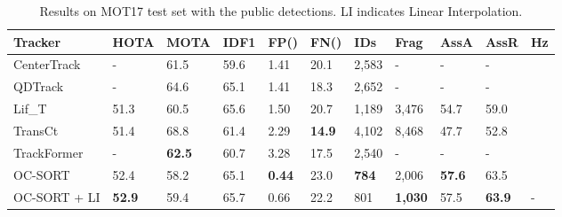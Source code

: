 \documentclass[10pt,twocolumn,letterpaper]{article}
\begin{document}
\begin{table*}[t]
\centering
\caption{Results on MOT17 test set with the public detections. LI indicates Linear Interpolation.
}
\setlength{\tabcolsep}{7pt}
\scriptsize
\begin{tabular}{ l | p{20px}p{20px}p{20px}p{27px} p{27px}p{22px}p{22px}p{20px}p{20px} H}

\toprule
Tracker & HOTA & MOTA & IDF1  &  FP({\footnotesize }) & FN({\footnotesize }) & IDs & Frag & AssA & AssR & Hz\\
\midrule
CenterTrack~\cite{centertrack} & - & 61.5 & 59.6 & 1.41 & 20.1 & 2,583 & - & - & - \\
QDTrack~\cite{pang2021quasi} & - & 64.6 & 65.1  & 1.41 & 18.3 & 2,652 & - & - & - \\
Lif\_T~\cite{hornakova2020lifted} & 51.3 & 60.5 & 65.6  & 1.50 & 20.7 & 1,189 & 3,476 & 54.7 & 59.0 \\
TransCt~\cite{transcenter}  & 51.4 & 68.8 & 61.4  & 2.29 & \textbf{14.9} & 4,102 & 8,468 & 47.7 & 52.8\\
TrackFormer~\cite{meinhardt2021trackformer} & - & \textbf{62.5} & 60.7  & 3.28 & 17.5 & 2,540 & - & -& - \\
\midrule
OC-SORT & 52.4  & 58.2 & 65.1 & \textbf{0.44} & 23.0 & \textbf{784} & 2,006 & \textbf{57.6} & 63.5 \\

OC-SORT + LI & \textbf{52.9} & 59.4 & 65.7  & 0.66 & 22.2 & 801 & \textbf{1,030} & 57.5 & \textbf{63.9} & -\\
\bottomrule
\end{tabular}
\label{table:mot17_public}
\vspace{-0.2cm}
\end{table*}
\end{document}
